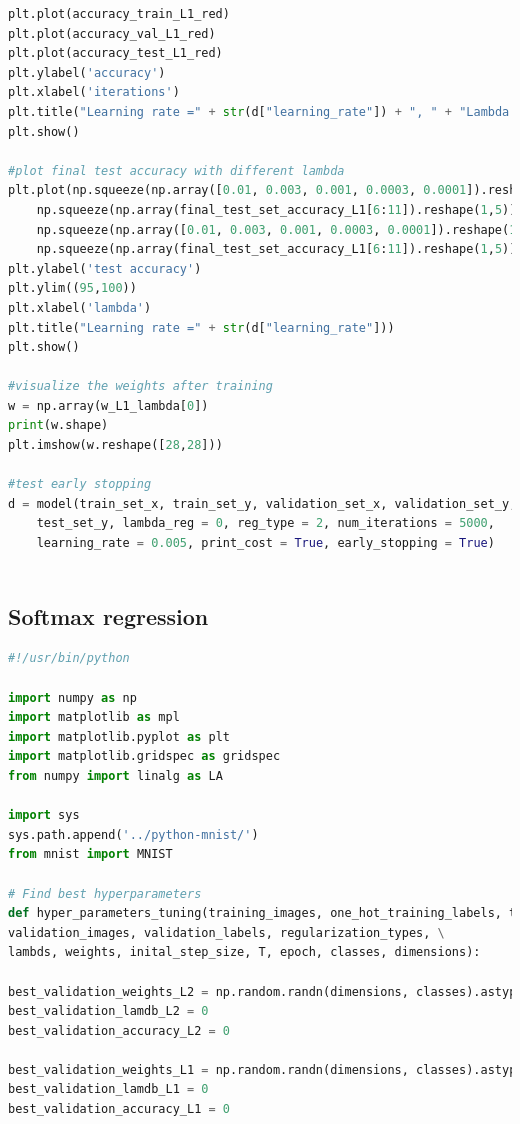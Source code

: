 \documentclass{article} %
\begin{document}
{\begin{lstlisting}[language=Python]
plt.plot(accuracy_train_L1_red)
plt.plot(accuracy_val_L1_red)
plt.plot(accuracy_test_L1_red)
plt.ylabel('accuracy')
plt.xlabel('iterations')
plt.title("Learning rate =" + str(d["learning_rate"]) + ", " + "Lambda =" + str(1))
plt.show()

#plot final test accuracy with different lambda
plt.plot(np.squeeze(np.array([0.01, 0.003, 0.001, 0.0003, 0.0001]).reshape(1,5)),
	np.squeeze(np.array(final_test_set_accuracy_L1[6:11]).reshape(1,5)), 
	np.squeeze(np.array([0.01, 0.003, 0.001, 0.0003, 0.0001]).reshape(1,5)),
	np.squeeze(np.array(final_test_set_accuracy_L1[6:11]).reshape(1,5)), 'or')
plt.ylabel('test accuracy')
plt.ylim((95,100))
plt.xlabel('lambda')
plt.title("Learning rate =" + str(d["learning_rate"]))
plt.show()

#visualize the weights after training
w = np.array(w_L1_lambda[0])
print(w.shape)
plt.imshow(w.reshape([28,28]))

#test early stopping
d = model(train_set_x, train_set_y, validation_set_x, validation_set_y, test_set_x, 
	test_set_y, lambda_reg = 0, reg_type = 2, num_iterations = 5000, 
	learning_rate = 0.005, print_cost = True, early_stopping = True)



\end{lstlisting}

\subsection{Softmax regression}
\begin{lstlisting}[language=Python]
#!/usr/bin/python 

import numpy as np
import matplotlib as mpl
import matplotlib.pyplot as plt
import matplotlib.gridspec as gridspec
from numpy import linalg as LA

import sys
sys.path.append('../python-mnist/')
from mnist import MNIST

# Find best hyperparameters 
def hyper_parameters_tuning(training_images, one_hot_training_labels, test_images, test_labels, \
validation_images, validation_labels, regularization_types, \
lambds, weights, inital_step_size, T, epoch, classes, dimensions):

best_validation_weights_L2 = np.random.randn(dimensions, classes).astype(np.float32) 
best_validation_lamdb_L2 = 0
best_validation_accuracy_L2 = 0

best_validation_weights_L1 = np.random.randn(dimensions, classes).astype(np.float32) 
best_validation_lamdb_L1 = 0
best_validation_accuracy_L1 = 0


\end{lstlisting}}
\end{document}
